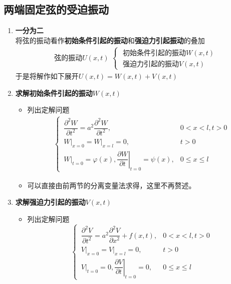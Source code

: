 \subsection{两端固定弦的受迫振动}
\begin{enumerate}
	\item \textbf{一分为二}\\
	将弦的振动看作\textbf{初始条件引起的振动}和\textbf{强迫力引起振动}的叠加
	\begin{align*}
		\mbox{弦的振动}U(x,t)\,\,
		\begin{cases}
			\,\,\mbox{初始条件引起的振动} W(x,t)\\
			\,\, \mbox{强迫力引起的振动} V(x,t)
		\end{cases}
	\end{align*}
	于是将解作如下展开$U(x,t) = W(x,t)+ V(x,t)$
	\item \textbf{求解初始条件引起的振动}$W(x,t)$
	\begin{itemize}
		\item 列出定解问题
		\begin{align}
			\begin{cases}
				\,\dfrac{\partial^2 W}{\partial t^2} = a^2 \dfrac{\partial^2 W}{\partial t^2}, &0 < x < l, t>0\\
				\,\left. W \right|_{x= 0} = \left. W \right|_{x = l} = 0,& t> 0\\
				\,\left. W \right|_{t=0} = \varphi(x), \left. \dfrac{\partial W}{\partial t} \right|_{t = 0} = \psi(x),& 0 \le x \le l
			\end{cases}
		\end{align}
		\item 可以直接由前两节的分离变量法求得，这里不再赘述。
	\end{itemize}
	\item \textbf{求解强迫力引起的振动}$V(x,t)$
	\begin{itemize}
		\item 列出定解问题
		\begin{equation}
			\begin{cases}
				\,\dfrac{\partial^2 V}{\partial t^2} = a^2 \dfrac{\partial^2 V}{\partial x^2} + f(x,t), &0<x<l,t>0 \\[0.5em]
				\,\left. V \right|_{x = 0} = \left. V \right|_{x = l} = 0,& t>0\\[0.5em]
				\,\left. V \right|_{t = 0} = 0, \left. \dfrac{\partial V}{\partial t}\right|_{t = 0} = 0,& 0 \le x \le l
			\end{cases}
		\end{equation}

\end{itemize}
\end{enumerate}
